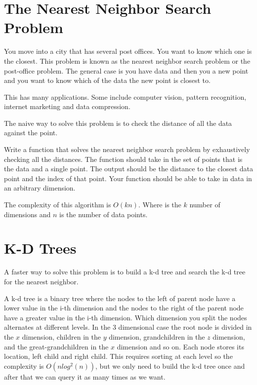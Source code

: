 \label{Ch:NNS}


\section*{The Nearest Neighbor Search Problem}

You move into a city that has several post offices.
You want to know which one is the closest.
This problem is  known as the nearest neighbor search problem or the post-office problem.
The general case is you have data and then you a new point and you want to know which of the data the new point is closest to.

This has many applications.
Some include computer vision, pattern recognition, internet marketing and data compression.

The naive way to solve this problem is to check the distance of all the data against the point.

\begin{problem}
Write a function that solves the nearest neighbor search problem by exhaustively checking all the distances.
The function should take in the set of points that is the data and a single point.
The output should be the distance to the closest data point and the index of that point.
Your function should be able to take in data in an arbitrary dimension.
\end{problem}

The complexity of this algorithm is $O(kn)$.
Where  is the $k$ number of dimensions and $n$ is the number of data points.

\section*{K-D Trees}

A faster way to solve this problem is to build a k-d tree and search the k-d tree for the nearest neighbor. 

A k-d tree is a binary tree where the nodes to the left of parent node have a lower value in the i-th dimension and the nodes to the right of the parent node have a greater value in the i-th dimension.
Which dimension you split the nodes alternates at different levels.
In the $3$ dimensional case the root node is divided in the $x$ dimension, children in the $y$ dimension, grandchildren in the $z$ dimension, and the great-grandchildren in the $x$ dimension and so on.
Each node stores its location, left child and right child.
This requires sorting at each level so the complexity is $O(nlog^2(n))$, but we only need to build the k-d tree once and after that we can query it as many times as we want.


